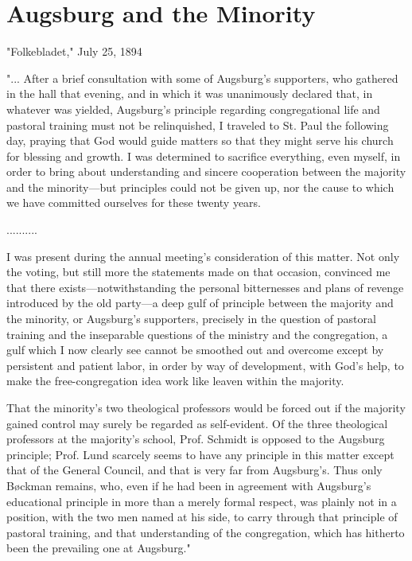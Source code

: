 
\section{Augsburg and the Minority}

"Folkebladet," July 25, 1894

"... After a brief consultation with some of Augsburg’s supporters, who gathered in the hall that evening, and in which it was unanimously declared that, in whatever was yielded, Augsburg’s principle regarding congregational life and pastoral training must not be relinquished, I traveled to St. Paul the following day, praying that God would guide matters so that they might serve his church for blessing and growth. I was determined to sacrifice everything, even myself, in order to bring about understanding and sincere cooperation between the majority and the minority—but principles could not be given up, nor the cause to which we have committed ourselves for these twenty years.

..........

I was present during the annual meeting’s consideration of this matter. Not only the voting, but still more the statements made on that occasion, convinced me that there exists—notwithstanding the personal bitternesses and plans of revenge introduced by the old party—a deep gulf of principle between the majority and the minority, or Augsburg’s supporters, precisely in the question of pastoral training and the inseparable questions of the ministry and the congregation, a gulf which I now clearly see cannot be smoothed out and overcome except by persistent and patient labor, in order by way of development, with God’s help, to make the free-congregation idea work like leaven within the majority.

That the minority’s two theological professors would be forced out if the majority gained control may surely be regarded as self-evident. Of the three theological professors at the majority’s school, Prof. Schmidt is opposed to the Augsburg principle; Prof. Lund scarcely seems to have any principle in this matter except that of the General Council, and that is very far from Augsburg’s. Thus only Bøckman remains, who, even if he had been in agreement with Augsburg’s educational principle in more than a merely formal respect, was plainly not in a position, with the two men named at his side, to carry through that principle of pastoral training, and that understanding of the congregation, which has hitherto been the prevailing one at Augsburg."

